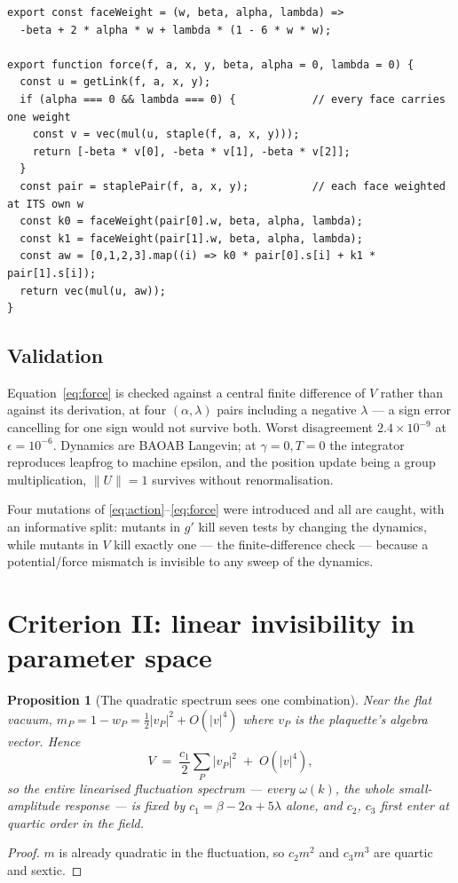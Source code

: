 \documentclass[11pt]{article}
\newtheorem{proposition}{Proposition}
\theoremstyle{remark}
\begin{document}
\begin{lstlisting}[caption={The force (abridged from \texttt{src/rotor-dynamics.ts}), with the pure-Wilson fast path retained so $\alpha=\lambda=0$ is bit-identical to the prior organ.},label={lst:force}]
export const faceWeight = (w, beta, alpha, lambda) =>
  -beta + 2 * alpha * w + lambda * (1 - 6 * w * w);

export function force(f, a, x, y, beta, alpha = 0, lambda = 0) {
  const u = getLink(f, a, x, y);
  if (alpha === 0 && lambda === 0) {            // every face carries one weight
    const v = vec(mul(u, staple(f, a, x, y)));
    return [-beta * v[0], -beta * v[1], -beta * v[2]];
  }
  const pair = staplePair(f, a, x, y);          // each face weighted at ITS own w
  const k0 = faceWeight(pair[0].w, beta, alpha, lambda);
  const k1 = faceWeight(pair[1].w, beta, alpha, lambda);
  const aw = [0,1,2,3].map((i) => k0 * pair[0].s[i] + k1 * pair[1].s[i]);
  return vec(mul(u, aw));
}
\end{lstlisting}

\subsection{Validation}

Equation~\eqref{eq:force} is checked against a central finite difference of $V$ rather
than against its derivation, at four $(\alpha,\lambda)$ pairs including a negative
$\lambda$ --- a sign error cancelling for one sign would not survive both. Worst
disagreement $2.4\times10^{-9}$ at $\epsilon=10^{-6}$. Dynamics are BAOAB Langevin; at
$\gamma=0,T=0$ the integrator reproduces leapfrog to machine epsilon, and the position
update being a group multiplication, $\|U\|=1$ survives without renormalisation.

Four mutations of \eqref{eq:action}--\eqref{eq:force} were introduced and all are
caught, with an informative split: mutants in $g'$ kill seven tests by changing the
dynamics, while mutants in $V$ kill exactly one --- the finite-difference check ---
because a potential/force mismatch is invisible to any sweep of the dynamics.

\section{Criterion II: linear invisibility in parameter space}\label{sec:invis}

\begin{proposition}[The quadratic spectrum sees one combination]\label{prop:c1}
Near the flat vacuum, $m_P=1-w_P=\tfrac12|v_P|^2+O(|v|^4)$ where $v_P$ is the
plaquette's algebra vector. Hence
\[
  V \;=\; \frac{c_1}{2}\sum_P |v_P|^2 \;+\; O(|v|^4),
\]
so the entire linearised fluctuation spectrum --- every $\omega(k)$, the whole
small-amplitude response --- is fixed by $c_1=\beta-2\alpha+5\lambda$ alone, and $c_2$,
$c_3$ first enter at \emph{quartic} order in the field.
\end{proposition}
\begin{proof}
$m$ is already quadratic in the fluctuation, so $c_2m^2$ and $c_3m^3$ are quartic and
sextic.
\end{proof}
\end{document}
